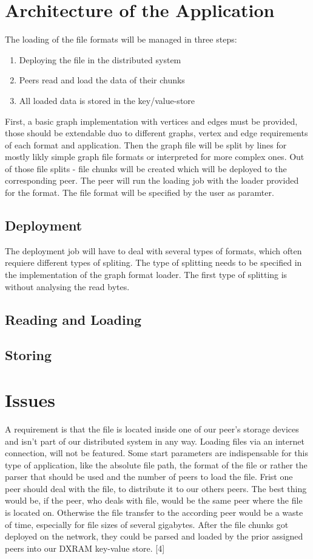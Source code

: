 \section{Architecture of the Application}
The loading of the file formats will be managed in three steps:
\begin{enumerate}
\item Deploying the file in the distributed system 
\item Peers read and load the data of their chunks
\item All loaded data is stored in the key/value-store
\end{enumerate}

First, a basic graph implementation with vertices and edges must be provided, those should be extendable duo to different graphs, vertex and edge requirements of each format and application.
Then the graph file will be split by lines for mostly likly simple graph file formats or interpreted for more complex ones. Out of those file splits - file chunks will be created which will be deployed to the corresponding peer. The peer will run the loading job with the loader provided for the format. The file format will be specified by the user as paramter.


\subsection{Deployment}
The deployment job will have to deal with several types of formats, which often requiere different types of spliting. The type of splitting needs to be specified in the implementation of the graph format loader. The first type of splitting is without analysing the read bytes. 

\subsection{Reading and Loading}

\subsection{Storing}

\section{Issues}
A requirement is that the file is located inside one of our peer’s storage devices and isn’t part of our distributed system in any way. Loading files via an internet connection, will not be featured. Some start parameters are indispensable for this type of application, like the absolute file path, the format of the file or rather the parser that should be used and the number of peers to load the file.
Frist one peer should deal with the file, to distribute it to our others peers. The best thing would be, if the peer, who deals with file, would be the same peer where the file is located on. Otherwise the file transfer to the according peer would be a waste of time, especially for file sizes of several gigabytes. After the file chunks got deployed on the network, they could be parsed and loaded by the prior assigned peers into our DXRAM key-value store. [4]


